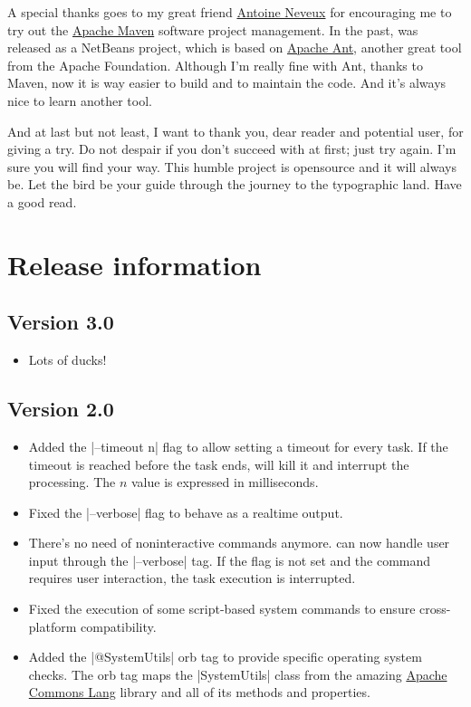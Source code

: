 \documentclass[a4paper,twoside,12pt]{memoir}
\begin{document}
A special thanks goes to my great friend \href{http://antoineneveux.fr/}{Antoine Neveux} for encouraging me to try out the \href{http://maven.apache.org}{Apache Maven} software project management. In the past, \arara was released as a NetBeans project, which is based on \href{http://ant.apache.org/}{Apache Ant}, another great tool from the Apache Foundation. Although I'm really fine with Ant, thanks to Maven, now it is way easier to build and to maintain the code. And it's always nice to learn another tool.

And at last but not least, I want to thank you, dear reader and potential user, 
for giving \arara a try. Do not despair if you don't succeed with \arara at first; just try again. I'm sure you will find your way. This humble project is opensource and it will always be. Let the bird be your guide through the journey to the typographic land. Have a good read.

\cleardoublepage

\section*{Release information}

\subsection*{Version 3.0}
\begin{itemize}
\item[\newfeature] 
     Lots of ducks!
\end{itemize}

\subsection*{Version 2.0}
\begin{itemize}
\item[\newfeature] 
     Added the |--timeout n| flag to allow setting a timeout for every task. If
     the timeout is reached before the task ends, \arara will kill it and 
     interrupt the processing. The $n$ value is expressed in milliseconds.
\item[\bugfix] 
     Fixed the |--verbose| flag to behave as a realtime output.
\item[\newfeature] 
     There's no need of noninteractive commands anymore. \arara can now handle
     user input through the |--verbose| tag. If the flag is not set and the 
     command requires user interaction, the task execution is interrupted.
\item[\bugfix] 
     Fixed the execution of some script-based system commands to ensure 
     cross-platform compatibility.
\item[\newfeature] 
     Added the |@{SystemUtils}| orb tag to provide specific operating system 
     checks. The orb tag maps the |SystemUtils| class from the amazing 
     \href{http://commons.apache.org/lang/}{Apache Commons Lang} library and 
     all of its methods and properties.
\end{itemize}
\end{document}
